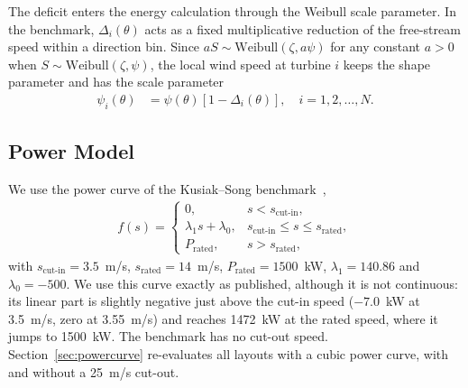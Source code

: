 \documentclass[journal,twoside]{IEEEtran}
\begin{document}
The deficit enters the energy calculation through the Weibull scale parameter. In the benchmark, $\Delta_i(\theta)$ acts as a fixed multiplicative reduction of the free-stream speed within a direction bin. Since $aS\sim\mathrm{Weibull}(\zeta,a\psi)$ for any constant $a>0$ when $S\sim\mathrm{Weibull}(\zeta,\psi)$, the local wind speed at turbine $i$ keeps the shape parameter and has the scale parameter
\begin{align}
\psi_i(\theta) &= \psi(\theta)\left[1-\Delta_i(\theta)\right],
\quad i=1,2,\ldots,N. \label{eq:weibull-scale}
\end{align}

\subsection{Power Model}
\label{sec:powermodel}

We use the power curve of the Kusiak--Song benchmark~\cite{Kusiak2010},
\begin{align}\label{eq7}
f(s) =
\begin{cases}
0, & s < s_{\text{cut-in}},\\
\lambda_1 s + \lambda_0, & s_{\text{cut-in}} \leq s \leq s_{\text{rated}},\\
P_{\text{rated}}, & s > s_{\text{rated}},
\end{cases}
\end{align}
with $s_{\text{cut-in}}=3.5$~m/s, $s_{\text{rated}}=14$~m/s, $P_{\text{rated}}=1500$~kW, $\lambda_1=140.86$ and $\lambda_0=-500$. We use this curve exactly as published, although it is not continuous: its linear part is slightly negative just above the cut-in speed ($-7.0$~kW at 3.5~m/s, zero at 3.55~m/s) and reaches 1472~kW at the rated speed, where it jumps to 1500~kW. The benchmark has no cut-out speed. Section~\ref{sec:powercurve} re-evaluates all layouts with a cubic power curve, with and without a 25~m/s cut-out.
\end{document}
